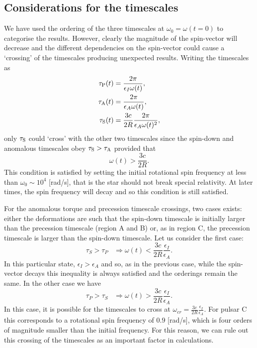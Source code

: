 \documentclass[../full_thesis/full_thesis.tex]{subfiles}
\begin{document}
\begin{subappendices}
\section{Considerations for the timescales}\label{sec: timescales}
We have used the ordering of the three timescales at $\omega_{0}=\omega(t=0)$
to categorise the results. However, clearly the magnitude of the spin-vector
will decrease and the different dependencies on the spin-vector could cause a
`crossing' of the timescales producing unexpected results. Writing the
timescales as
\begin{align}
\tau_{\mathrm{P}}(t)&=\frac{2\pi}{\epsilon_{I}\omega(t)}, \\
\tau_{\mathrm{A}}(t)&=\frac{2\pi}{\epsilon_{A}\omega(t)}, \\
\tau_{\mathrm{S}}(t)&=\frac{3c}{2R}\frac{2\pi}{\epsilon_{A}\omega(t)^{2}},\\
\end{align}
only $\tau_{\mathrm{S}}$ could `cross' with the other two timescales since the spin-down
and anomalous timescales obey $\tau_{\mathrm{S}}>\tau_{\mathrm{A}}$ provided that
\begin{equation}
\omega(t)>\frac{3c}{2R}.
\end{equation}
This condition is satisfied by setting the initial rotational spin frequency at
less than $\omega_{0} \sim 10^{4}$ [rad/s], that is the star should not break
special relativity. At later times, the spin frequency will decay and so this
condition is still satisfied.

For the anomalous torque and precession timescale crossings, two cases exists:
either the deformations are such that the spin-down timescale is initially larger than
the precession timescale (region A and B) or, as in region C, the precession
timescale is larger than the spin-down timescale. Let us consider the first case:
\begin{equation}
\tau_{S}>\tau_{P} \;\;\;
\Rightarrow \omega(t)<\frac{3c}{2R}\frac{\epsilon_{I}}{\epsilon_{A}}.
\end{equation}
In this particular state, $\epsilon_{I}>\epsilon_{A}$ and so, as in the previous
case, while the spin-vector decays this inequality is always satisfied and the
orderings remain the same. In the other case we have
\begin{equation}
\tau_{P}>\tau_{S} \;\;\;
\Rightarrow \omega(t)>\frac{3c}{2R}\frac{\epsilon_{I}}{\epsilon_{A}}.
\end{equation}
In this case, it is possible for the timescales to cross at
$\omega_{cr}=\frac{3c}{2R}\frac{\epsilon_{I}}{\epsilon_{A}}$. For pulsar C this
corresponds to a rotational spin frequency of $0.9$ [rad/s], which is four
orders of magnitude smaller than the initial frequency. For this reason, we can
rule out this crossing of the timescales as an important factor in
calculations.


\end{subappendices}

\biblio
\end{document}
